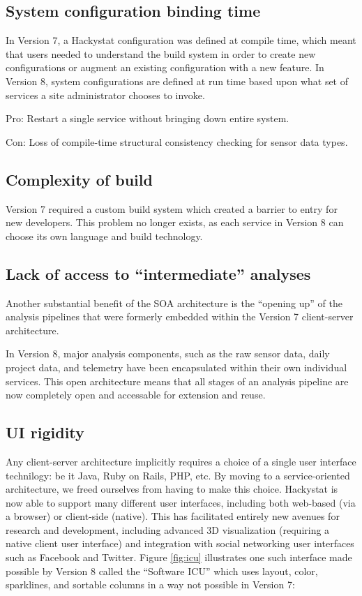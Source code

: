 \documentclass[conference,compsoc,peerreview]{IEEEtran}
\begin{document}
\subsection{System configuration binding time}

In Version 7, a Hackystat configuration was defined at compile time, which
meant that users needed to understand the build system in order to create
new configurations or augment an existing configuration with a new feature.
In Version 8, system configurations are defined at run time based upon what
set of services a site administrator chooses to invoke.  

Pro: Restart a single service without bringing down entire system.

Con: Loss of compile-time structural consistency checking for sensor data types.


\subsection{Complexity of build}

Version 7 required a custom build system which created a barrier to entry
for new developers.  This problem no longer exists, as each service in
Version 8 can choose its own language and build technology.

\subsection{Lack of access to ``intermediate'' analyses}

Another substantial benefit of the SOA architecture is the ``opening up''
of the analysis pipelines that were formerly embedded within the Version 7
client-server architecture.

In Version 8, major analysis components, such as the raw sensor data, daily
project data, and telemetry have been encapsulated within their own
individual services.  This open architecture means that all stages of an
analysis pipeline are now completely open and accessable for extension and reuse. 

\subsection{UI rigidity}

Any client-server architecture implicitly requires a choice of a single
user interface technilogy: be it Java, Ruby on Rails, PHP, etc.  By moving
to a service-oriented architecture, we freed ourselves from having to make
this choice. Hackystat is now able to support many different user
interfaces, including both web-based (via a browser) or client-side
(native).  This has facilitated entirely new avenues for research and
development, including advanced 3D visualization (requiring a native client
user interface) and integration with social networking user interfaces such
as Facebook and Twitter.  Figure \ref{fig:icu} illustrates one such 
interface made possible by Version 8 called the ``Software ICU'' which uses 
layout, color, sparklines, and sortable columns in a way not possible in Version 7:
\end{document}
